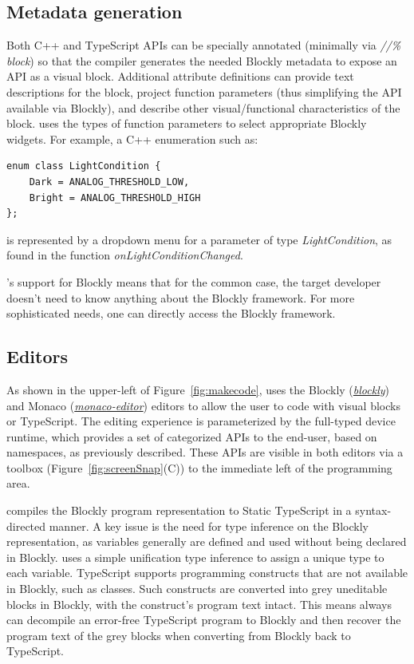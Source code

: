 \subsection{Metadata generation}

Both C++ and TypeScript APIs can be specially annotated (minimally via 
\emph{//\% block}) so that the \MC compiler generates the needed
Blockly metadata to expose an API as a visual block.
Additional attribute definitions can provide text descriptions for the block, project function
parameters (thus simplifying the API available via Blockly), and describe other visual/functional
characteristics of the block.  \MC uses the types of function parameters to select appropriate
Blockly widgets.  For example, a C++ enumeration such as:
\begin{lstlisting}
enum class LightCondition {
    Dark = ANALOG_THRESHOLD_LOW,
    Bright = ANALOG_THRESHOLD_HIGH
};
\end{lstlisting}
is represented by a dropdown menu for a parameter of type \emph{LightCondition}, as found in
the function \emph{onLightConditionChanged}.
 
\MCN's support for Blockly means that for the common case, the target developer doesn't need
to know anything about the Blockly framework.
For more sophisticated needs, one can directly access the Blockly framework. 

\subsection{Editors}

As shown in the upper-left of Figure~\ref{fig:makecode},
\MC uses the Blockly (\emph{\href{https://github.com/google/blockly}{blockly}}) and Monaco 
(\emph{\href{https://github.com/Microsoft/monaco-editor}{monaco-editor}}) editors to allow the user to code with
visual blocks or TypeScript. The editing experience is parameterized by the full-typed device
runtime, which provides a set of categorized APIs to the end-user, based on namespaces, as
previously described. These APIs are visible in both editors via a toolbox (Figure~\ref{fig:screenSnap}(C))
to the immediate left of the programming area. 

\MC compiles the Blockly program representation to Static TypeScript in a syntax-directed manner.
A key issue is the need for type inference on the Blockly representation, as variables generally are defined and used without
being declared in Blockly. \MC uses a simple unification type inference to assign a
unique type to each variable.  
TypeScript supports programming constructs that are not available in Blockly, such as classes.
Such constructs are converted into grey uneditable blocks in Blockly, with the construct's program
text intact. This means \MC always can decompile an error-free TypeScript program to Blockly and then recover
the program text of the grey blocks when converting from Blockly back to TypeScript.

